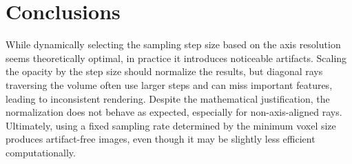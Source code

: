 \documentclass[10pt,a4paper,twoside]{tau-book}
\begin{document}
\section{Conclusions}


While dynamically selecting the sampling step size based on the axis resolution seems theoretically optimal, in practice it introduces noticeable artifacts. Scaling the opacity by the step size should normalize the results, but diagonal rays traversing the volume often use larger steps and can miss important features, leading to inconsistent rendering. Despite the mathematical justification, the normalization does not behave as expected, especially for non-axis-aligned rays. Ultimately, using a fixed sampling rate determined by the minimum voxel size produces artifact-free images, even though it may be slightly less efficient computationally.







\end{document}
